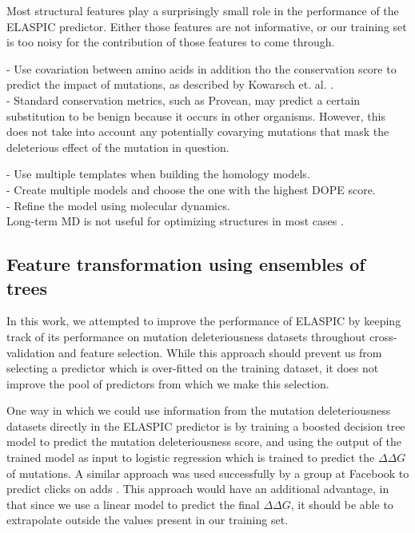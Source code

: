 Most structural features play a surprisingly small role in the performance of the ELASPIC predictor. Either those features are not informative, or our training set is too noisy for the contribution of those features to come through.



- Use covariation between amino acids in addition tho the conservation score to predict the impact of mutations, as described by Kowarsch et. al. \cite{kowarsch_correlated_2010}. \\
- Standard conservation metrics, such as Provean, may predict a certain substitution to be benign because it occurs in other organisms. However, this does not take into account any potentially covarying mutations that mask the deleterious effect of the mutation in question.



- Use multiple templates when building the homology models. \\
- Create multiple models and choose the one with the highest DOPE score. \\
- Refine the model using molecular dynamics. \\

Long-term MD is not useful for optimizing structures in most cases \cite{raval_refinement_2012}.

\subsection{Feature transformation using ensembles of trees}

In this work, we attempted to improve the performance of ELASPIC by keeping track of its performance on mutation deleteriousness datasets throughout cross-validation and feature selection. While this approach should prevent us from selecting a predictor which is over-fitted on the training dataset, it does not improve the pool of predictors from which we make this selection.

One way in which we could use information from the mutation deleteriousness datasets directly in the ELASPIC predictor is by training a boosted decision tree model to predict the mutation deleteriousness score, and using the output of the trained model as input to logistic regression which is trained to predict the $\Delta \Delta G$ of mutations. A similar approach was used successfully by a group at Facebook to predict clicks on adds \cite{he_practical_2014}. This approach would have an additional advantage, in that since we use a linear model to predict the final $\Delta \Delta G$, it should be able to extrapolate outside the values present in our training set.

